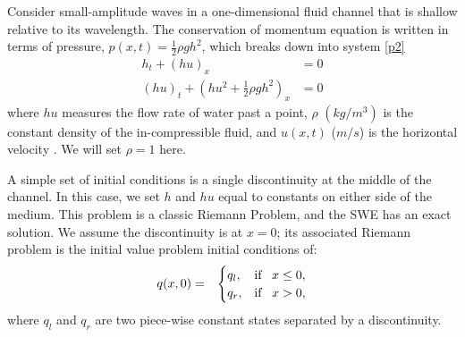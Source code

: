 \documentclass[10pt,a4paper]{article}
\newcommand{\donna}[1]{{\color{red}{#1}}}
\begin{document}
		Consider small-amplitude waves in a one-dimensional fluid channel that is shallow relative to its wavelength. The conservation \donna{mass and} of momentum equation is written in terms of \donna{height h(t), momentrum hu and } pressure, $p(x,t) = \frac{1}{2}\rho gh^{2}$, which breaks down into system \eqref{p2}
	\begin{equation}
		\begin{aligned}
			h_{t} + (hu)_x &= 0 \\
			(hu)_t + \left(hu^{2} + \frac{1}{2}\rho gh^{2} \right)_x & = 0 
		\end{aligned}
		\label{p2}
	\end{equation}	
	where $hu$ measures the flow rate of water past a point,  $\rho$ $(kg/m^{3})$ is the constant density of the in-compressible fluid, and $u(x,t)$ ($m/s$) is the horizontal velocity  \cite{leveque2002finite,toro2001shock}.  We will set $\rho = 1$ here.
	
	A simple set of initial conditions is a single discontinuity at the middle of the channel.  In this case, we set $h$ and $hu$ equal to constants on either side of the medium.  This problem is a classic Riemann Problem, and the SWE has an exact solution.  We assume the discontinuity is at $x = 0$; its associated Riemann problem is the initial value problem initial conditions of:
		\begin{eqnarray}
		q(x,0)& =& \begin{cases}
			q_{l}, & \text{if \, $x \le 0,$}\\
			q_{r},& \text{if \, $x > 0,$}\\
			
		\end{cases}  
		\label{rp1}     
	\end{eqnarray}
where $q_{l}$ and $q_{r}$ are two piece-wise constant states separated by a discontinuity. 
\end{document}
